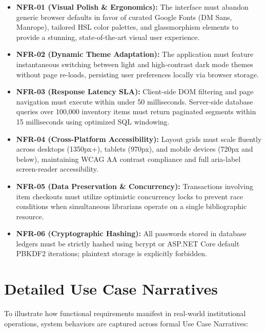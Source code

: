 \documentclass[11pt,a4paper]{report}
\begin{document}
\begin{itemize}[leftmargin=1.5em]
    \item \textbf{NFR-01 (Visual Polish \& Ergonomics):} The interface must abandon generic browser defaults in favor of curated Google Fonts (DM Sans, Manrope), tailored HSL color palettes, and glassmorphism elements to provide a stunning, state-of-the-art visual user experience.
    \item \textbf{NFR-02 (Dynamic Theme Adaptation):} The application must feature instantaneous switching between light and high-contrast dark mode themes without page re-loads, persisting user preferences locally via browser storage.
    \item \textbf{NFR-03 (Response Latency SLA):} Client-side DOM filtering and page navigation must execute within under 50 milliseconds. Server-side database queries over 100,000 inventory items must return paginated segments within 15 milliseconds using optimized SQL windowing.
    \item \textbf{NFR-04 (Cross-Platform Accessibility):} Layout grids must scale fluently across desktops (1350px+), tablets (970px), and mobile devices (720px and below), maintaining WCAG AA contrast compliance and full aria-label screen-reader accessibility.
    \item \textbf{NFR-05 (Data Preservation \& Concurrency):} Transactions involving item checkouts must utilize optimistic concurrency locks to prevent race conditions when simultaneous librarians operate on a single bibliographic resource.
    \item \textbf{NFR-06 (Cryptographic Hashing):} All passwords stored in database ledgers must be strictly hashed using bcrypt or ASP.NET Core default PBKDF2 iterations; plaintext storage is explicitly forbidden.
\end{itemize}

\newpage

\section{Detailed Use Case Narratives}
To illustrate how functional requirements manifest in real-world institutional operations, system behaviors are captured across formal Use Case Narratives:
\end{document}
